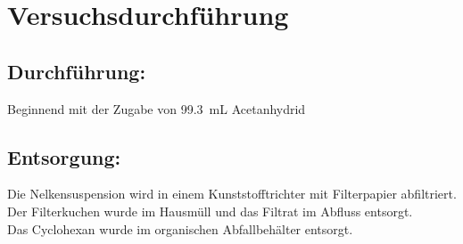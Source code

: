 \section{Versuchsdurchführung}
\label{sec:durchfuerung}


\subsection*{Durchführung:}
Beginnend mit der Zugabe von \SI{99,3}{\milli \liter} Acetanhydrid

\subsection*{Entsorgung:}
Die Nelkensuspension wird in einem Kunststofftrichter mit Filterpapier abfiltriert. Der Filterkuchen wurde im Hausmüll und das Filtrat im Abfluss entsorgt.\\
Das Cyclohexan wurde im organischen Abfallbehälter entsorgt.